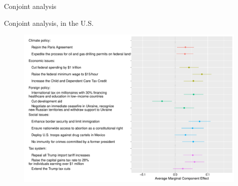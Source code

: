 \documentclass[aspectratio=169,xcolor=dvipsnames, 11pt,mathserif]{beamer}
\begin{document}
\begin{frame}{Conjoint analysis}
\end{frame}

\begin{frame}{Conjoint analysis, in the U.S. \hyperlink{conjoint_countries}{}\label{conjoint_country}} 
    \begin{figure} \vspace{-.15cm}
\includegraphics[height=.97\textheight]{../figures/all/conjoint_EN.pdf}
\end{figure}
\end{frame}

\end{document}

